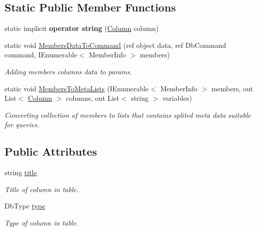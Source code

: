 \subsection*{Static Public Member Functions}
\begin{DoxyCompactItemize}
\item 
\mbox{\label{class_uniform_data_operator_1_1_sql_1_1_tables_1_1_attributes_1_1_column_aa4c7155cd1445683e6e746e3ad6cbe79}} 
static implicit {\bfseries operator string} (\mbox{\hyperlink{class_uniform_data_operator_1_1_sql_1_1_tables_1_1_attributes_1_1_column}{Column}} column)
\item 
static void \mbox{\hyperlink{class_uniform_data_operator_1_1_sql_1_1_tables_1_1_attributes_1_1_column_a8351a69a11f029f6cd4c079bf4612c6e}{Members\+Data\+To\+Command}} (ref object data, ref Db\+Command command, I\+Enumerable$<$ Member\+Info $>$ members)
\begin{DoxyCompactList}\small\item\em Adding members columns data to params. \end{DoxyCompactList}\item 
static void \mbox{\hyperlink{class_uniform_data_operator_1_1_sql_1_1_tables_1_1_attributes_1_1_column_a2b541e05a1c7ef24a047b9a896899dce}{Members\+To\+Meta\+Lists}} (I\+Enumerable$<$ Member\+Info $>$ members, out List$<$ \mbox{\hyperlink{class_uniform_data_operator_1_1_sql_1_1_tables_1_1_attributes_1_1_column}{Column}} $>$ columns, out List$<$ string $>$ variables)
\begin{DoxyCompactList}\small\item\em Converting collection of members to lists that contain\textquotesingle{}s splited meta data suitable for queries. \end{DoxyCompactList}\end{DoxyCompactItemize}
\subsection*{Public Attributes}
\begin{DoxyCompactItemize}
\item 
string \mbox{\hyperlink{class_uniform_data_operator_1_1_sql_1_1_tables_1_1_attributes_1_1_column_a5f723f7b56e2765e2515010288ada510}{title}}
\begin{DoxyCompactList}\small\item\em Title of column in table. \end{DoxyCompactList}\item 
Db\+Type \mbox{\hyperlink{class_uniform_data_operator_1_1_sql_1_1_tables_1_1_attributes_1_1_column_aaa92c4d6a084014da5a521eab2c8a377}{type}}
\begin{DoxyCompactList}\small\item\em Type of column in table. \end{DoxyCompactList}\end{DoxyCompactItemize}


